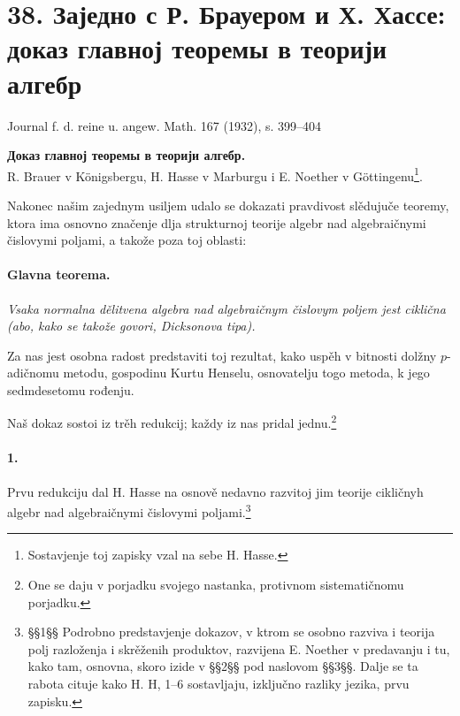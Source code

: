 \documentclass[11pt]{article}
\newcommand{\foreign}[1]{#1}
\begin{document}
\section*{38. Заједно с Р. Брауером и Х. Хассе: доказ главној теоремы в теорији алгебр}

\begin{center}
\foreign{Journal f. d. reine u. angew. Math. 167 (1932), s. 399--404}
\end{center}

\begin{center}
\textbf{Доказ главној теоремы в теорији алгебр.}\\[0.5em]
R. Brauer v Königsbergu, H. Hasse v Marburgu i E. Noether v Göttingenu\footnote{Sostavjenje toj zapisky vzal na sebe H. Hasse.}.
\end{center}

Nakonec našim zajednym usiljem udalo se dokazati pravdivost slědujuče teoremy, ktora ima osnovno značenje dlja strukturnoj teorije algebr nad algebraičnymi čislovymi poljami, a takože poza toj oblasti:

\paragraph{Glavna teorema.}
\emph{Vsaka normalna dělitvena algebra nad algebraičnym čislovym poljem jest ciklična (abo, kako se takože govori, Dicksonova tipa).}

Za nas jest osobna radost predstaviti toj rezultat, kako uspěh v bitnosti dolžny \(p\)-adičnomu metodu, gospodinu Kurtu Henselu, osnovatelju togo metoda, k jego sedmdesetomu rođenju.

Naš dokaz sostoi iz trěh redukcij; každy iz nas pridal jednu.\footnote{One se daju v porjadku svojego nastanka, protivnom sistematičnomu porjadku.}

\paragraph{1.}
Prvu redukciju dal H. Hasse na osnově nedavno razvitoj jim teorije cikličnyh algebr nad algebraičnymi čislovymi poljami.\footnote{§§1§§ Podrobno predstavjenje dokazov, v ktrom se osobno razviva i teorija polj razloženja i skrěženih produktov, razvijena E. Noether v predavanju i tu, kako tam, osnovna, skoro izide v §§2§§ pod naslovom §§3§§. Dalje se ta rabota cituje kako H. H, 1--6 sostavljaju, izključno razliky jezika, prvu zapisku.}
\end{document}
